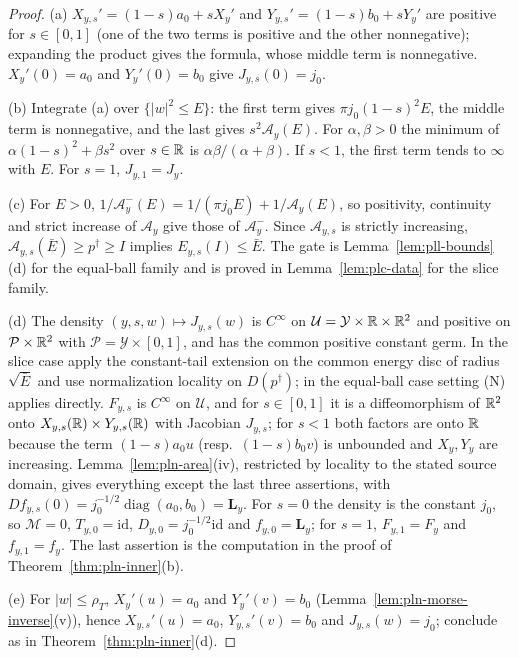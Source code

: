 \begin{proof}
(a) $X_{y,s}'=(1-s)a_0+sX_y'$ and $Y_{y,s}'=(1-s)b_0+sY_y'$ are positive for $s\in[0,1]$ (one of the two terms is
positive and the other nonnegative); expanding the product gives the formula, whose middle term is
nonnegative. $X_y'(0)=a_0$ and $Y_y'(0)=b_0$ give $J_{y,s}(0)=j_0$.

(b) Integrate (a) over $\{|w|^2\le E\}$: the first term gives $\pi j_0(1-s)^2E$, the middle term is nonnegative,
and the last gives $s^2\mathcal A_y(E)$. For $\alpha,\beta>0$ the minimum of $\alpha(1-s)^2+\beta s^2$ over $s\in\mathbb{R}$ is
$\alpha\beta/(\alpha+\beta)$. If $s<1$, the first term tends to $\infty$ with $E$. For $s=1$, $J_{y,1}=J_y$.

(c) For $E>0$, $1/\mathcal A^-_y(E)=1/(\pi j_0E)+1/\mathcal A_y(E)$, so positivity, continuity and strict increase of
$\mathcal A_y$ give those of $\mathcal A^-_y$. Since $\mathcal A_{y,s}$ is strictly increasing,
$\mathcal A_{y,s}(\bar E)\ge p^\dagger\ge I$ implies $E_{y,s}(I)\le\bar E$. The gate is Lemma~\ref{lem:pll-bounds}(d) for the
equal-ball family and is proved in Lemma~\ref{lem:plc-data} for the slice family.

(d) The density $(y,s,w)\mapsto J_{y,s}(w)$ is $C^\infty$ on $\mathcal U=\mathcal Y\times\mathbb{R}\times\mathbb{R}^2$ and positive on
$\mathcal P\times\mathbb{R}^2$ with $\mathcal P=\mathcal Y\times[0,1]$, and has the common positive constant germ. In the slice case apply the constant-tail extension on the common energy disc of radius $\sqrt{\bar E}$ and use normalization locality on $D(p^\dagger)$; in the equal-ball case setting (N) applies directly. $F_{y,s}$ is $C^\infty$ on $\mathcal U$, and for
$s\in[0,1]$ it is a diffeomorphism of $\mathbb{R}^2$ onto $X_{y,s}(\mathbb{R})\times Y_{y,s}(\mathbb{R})$ with Jacobian $J_{y,s}$; for $s<1$
both factors are onto $\mathbb{R}$ because the term $(1-s)a_0u$ (resp.\ $(1-s)b_0v$) is unbounded and $X_y,Y_y$ are
increasing. Lemma~\ref{lem:pln-area}(iv), restricted by locality to the stated source domain, gives everything except the last three assertions, with
$Df_{y,s}(0)=j_0^{-1/2}\operatorname{diag}(a_0,b_0)=\mathbf L_y$. For $s=0$ the density is the constant $j_0$, so
$\mathcal M=0$, $T_{y,0}=\mathrm{id}$, $D_{y,0}=j_0^{-1/2}\mathrm{id}$ and $f_{y,0}=\mathbf L_y$; for $s=1$, $F_{y,1}=F_y$ and
$f_{y,1}=f_y$. The last assertion is the computation in the proof of Theorem~\ref{thm:pln-inner}(b).

(e) For $|w|\le\rho_T$, $X_y'(u)=a_0$ and $Y_y'(v)=b_0$ (Lemma~\ref{lem:pln-morse-inverse}(v)), hence
$X_{y,s}'(u)=a_0$, $Y_{y,s}'(v)=b_0$ and $J_{y,s}(w)=j_0$; conclude as in Theorem~\ref{thm:pln-inner}(d).
\end{proof}

